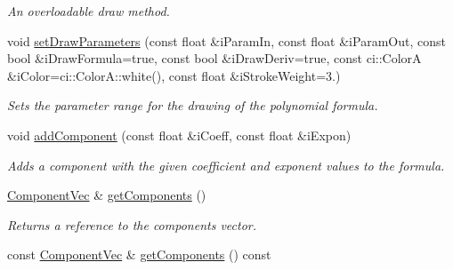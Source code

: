 \begin{DoxyCompactItemize}
\begin{DoxyCompactList}\small\item\em An overloadable draw method. \end{DoxyCompactList}\item 
\hypertarget{class_polynomial_data_addcf3ab3c6147919c43f44dd9af97db7}{void \hyperlink{class_polynomial_data_addcf3ab3c6147919c43f44dd9af97db7}{set\-Draw\-Parameters} (const float \&i\-Param\-In, const float \&i\-Param\-Out, const bool \&i\-Draw\-Formula=true, const bool \&i\-Draw\-Deriv=true, const ci\-::\-Color\-A \&i\-Color=ci\-::\-Color\-A\-::white(), const float \&i\-Stroke\-Weight=3.)}\label{class_polynomial_data_addcf3ab3c6147919c43f44dd9af97db7}

\begin{DoxyCompactList}\small\item\em Sets the parameter range for the drawing of the polynomial formula. \end{DoxyCompactList}\item 
\hypertarget{class_polynomial_data_a67c459e29c65ea79be11c6b9a209c6f8}{void \hyperlink{class_polynomial_data_a67c459e29c65ea79be11c6b9a209c6f8}{add\-Component} (const float \&i\-Coeff, const float \&i\-Expon)}\label{class_polynomial_data_a67c459e29c65ea79be11c6b9a209c6f8}

\begin{DoxyCompactList}\small\item\em Adds a component with the given coefficient and exponent values to the formula. \end{DoxyCompactList}\item 
\hypertarget{class_polynomial_data_ac2e4d723d0cde539326924933d34672a}{\hyperlink{class_polynomial_data_aa29043ac29b9eefb530b6671be625814}{Component\-Vec} \& \hyperlink{class_polynomial_data_ac2e4d723d0cde539326924933d34672a}{get\-Components} ()}\label{class_polynomial_data_ac2e4d723d0cde539326924933d34672a}

\begin{DoxyCompactList}\small\item\em Returns a reference to the components vector. \end{DoxyCompactList}\item 
\hypertarget{class_polynomial_data_ac34cf450bc6544e3b38aaeb3505f7f8d}{const \hyperlink{class_polynomial_data_aa29043ac29b9eefb530b6671be625814}{Component\-Vec} \& \hyperlink{class_polynomial_data_ac34cf450bc6544e3b38aaeb3505f7f8d}{get\-Components} () const }\label{class_polynomial_data_ac34cf450bc6544e3b38aaeb3505f7f8d}


\end{DoxyCompactItemize}
